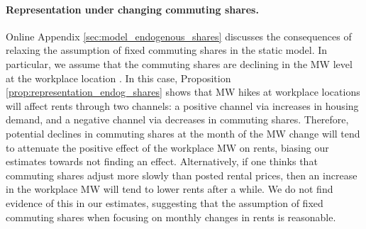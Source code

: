 \paragraph{Representation under changing commuting shares.} 

Online Appendix \ref{sec:model_endogenous_shares} discusses the consequences
of relaxing the assumption of fixed commuting shares in the static model.
In particular, we assume that the commuting shares are declining in the MW level
at the workplace location \parencite[as found by, e.g.,][]{PerezPerez2021}.
In this case, Proposition \ref{prop:representation_endog_shares} shows that MW
hikes at workplace locations will affect rents through two channels:
a positive channel via increases in housing demand, and
a negative channel via decreases in commuting shares.
Therefore, potential declines in commuting shares at the month of the MW change 
will tend to attenuate the positive effect of the workplace MW on rents, biasing 
our estimates towards not finding an effect.
Alternatively, if one thinks that commuting shares adjust more slowly than
posted rental prices, then an increase in the workplace MW will tend to
lower rents after a while.
We do not find evidence of this in our estimates, suggesting that the assumption
of fixed commuting shares when focusing on monthly changes in rents is
reasonable.
